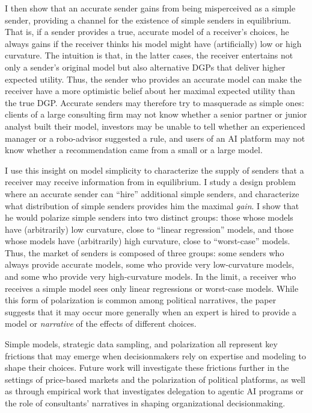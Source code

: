 \documentclass[11pt,dvipsnames]{article}
\begin{document}
I then show that an accurate sender gains from being misperceived as a simple sender, providing a channel for the existence of simple senders in equilibrium.
That is, if a sender provides a true, accurate model of a receiver's choices, he always gains if the receiver thinks his model might have (artificially) low or high curvature.
The intuition is that, in the latter cases, the receiver entertains not only a sender's original model but also alternative DGPs that deliver higher expected utility.
Thus, the sender who provides an accurate model can make the receiver have a more optimistic belief about her maximal expected utility than the true DGP.
Accurate senders may therefore try to masquerade as simple ones: clients of a large consulting firm may not know whether a senior partner or junior analyst built their model, investors may be unable to tell whether an experienced manager or a robo-advisor suggested a rule, and users of an AI platform may not know whether a recommendation came from a small or a large model.

I use this insight on model simplicity to characterize the supply of senders that a receiver may receive information from in equilibrium.
I study a design problem where an accurate sender can ``hire'' additional simple senders, and characterize what distribution of simple senders provides him the maximal \emph{gain}. 
I show that he would polarize simple senders into two distinct groups: those whose models have (arbitrarily) low curvature, close to ``linear regression'' models, and those whose models have (arbitrarily) high curvature, close to ``worst-case'' models.
Thus, the market of senders is composed of three groups: some senders who always provide accurate models, some who provide very low-curvature models, and some who provide very high-curvature models.
In the limit, a receiver who receives a simple model sees only linear regressions or worst-case models.
While this form of polarization is common among political narratives, the paper suggests that it may occur more generally when an expert is hired to provide a model or \emph{narrative} of the effects of different choices.

Simple models, strategic data sampling, and polarization all represent key frictions that may emerge when decisionmakers rely on expertise and modeling to shape their choices.
Future work will investigate these frictions further in the settings of price-based markets and the polarization of political platforms, as well as through empirical work that investigates delegation to agentic AI programs or the role of consultants' narratives in shaping organizational decisionmaking.
\pagebreak
\end{document}
